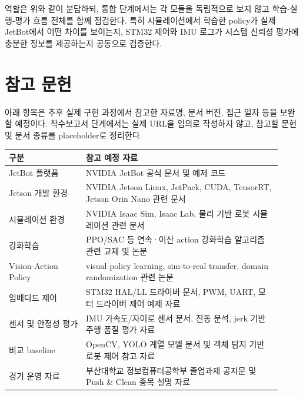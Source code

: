 \documentclass[titlepage]{pnureport}
\begin{document}
역할은 위와 같이 분담하되, 통합 단계에서는 각 모듈을 독립적으로 보지 않고 학습-실행-평가 흐름 전체를 함께 점검한다. 특히 시뮬레이션에서 학습한 policy가 실제 JetBot에서 어떤 차이를 보이는지, STM32 제어와 IMU 로그가 시스템 신뢰성 평가에 충분한 정보를 제공하는지 공동으로 검증한다.

\chapter{참고 문헌}

아래 항목은 추후 실제 구현 과정에서 참고한 자료명, 문서 버전, 접근 일자 등을 보완할 예정이다. 착수보고서 단계에서는 실제 URL을 임의로 작성하지 않고, 참고할 문헌 및 문서 종류를 placeholder로 정리한다.

\begin{longtable}{p{0.26\linewidth}p{0.66\linewidth}}
\toprule
구분 & 참고 예정 자료 \\
\midrule
\endhead
JetBot 플랫폼 & NVIDIA JetBot 공식 문서 및 예제 코드 \\
Jetson 개발 환경 & NVIDIA Jetson Linux, JetPack, CUDA, TensorRT, Jetson Orin Nano 관련 문서 \\
시뮬레이션 환경 & NVIDIA Isaac Sim, Isaac Lab, 물리 기반 로봇 시뮬레이션 관련 문서 \\
강화학습 & PPO/SAC 등 연속·이산 action 강화학습 알고리즘 관련 교재 및 논문 \\
Vision-Action Policy & visual policy learning, sim-to-real transfer, domain randomization 관련 논문 \\
임베디드 제어 & STM32 HAL/LL 드라이버 문서, PWM, UART, 모터 드라이버 제어 예제 자료 \\
센서 및 안정성 평가 & IMU 가속도/자이로 센서 문서, 진동 분석, jerk 기반 주행 품질 평가 자료 \\
비교 baseline & OpenCV, YOLO 계열 모델 문서 및 객체 탐지 기반 로봇 제어 참고 자료 \\
경기 운영 자료 & 부산대학교 정보컴퓨터공학부 졸업과제 공지문 및 Push \& Clean 종목 설명 자료 \\
\bottomrule
\end{longtable}
\end{document}
